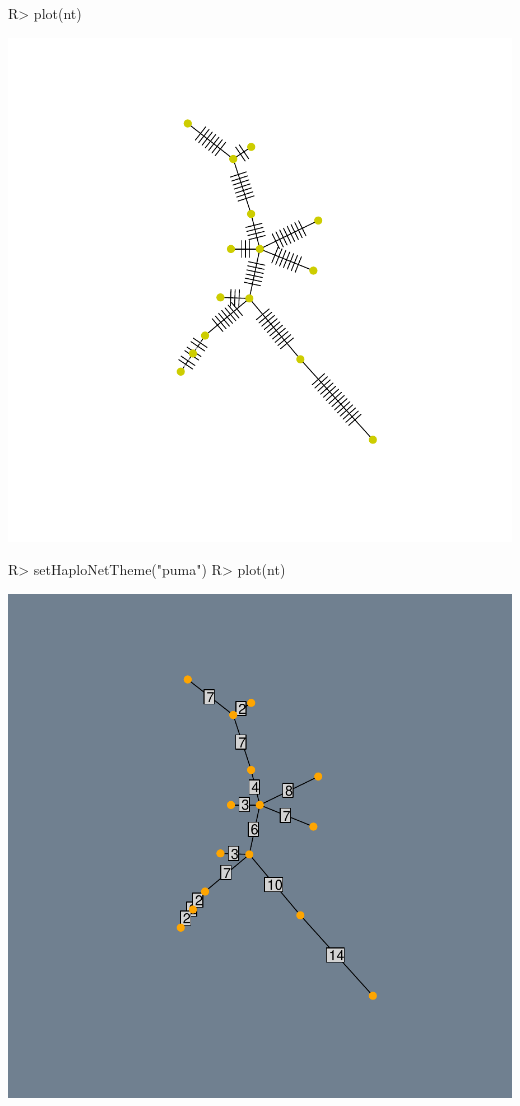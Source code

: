 \documentclass[a4paper]{article}
\begin{document}
\begin{Schunk}
\begin{Sinput}
R> plot(nt)
\end{Sinput}
\end{Schunk}
\includegraphics{PlotHaploNet-005}


\begin{Schunk}
\begin{Sinput}
R> setHaploNetTheme("puma")
R> plot(nt)
\end{Sinput}
\end{Schunk}
\includegraphics{PlotHaploNet-006}
\end{document}
